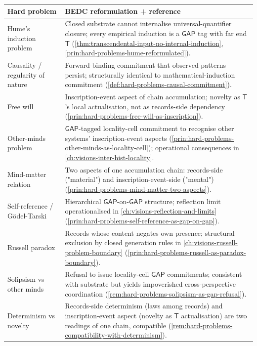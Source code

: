 \begin{longtable}{p{}p{}}
\toprule
\textbf{Hard problem} & \textbf{BEDC reformulation + reference} \\
\midrule
Hume's induction problem & Closed substrate cannot internalise universal-quantifier closure; every empirical induction is a $\mathsf{GAP}$ tag with far end $\mathsf{T}$ (\autoref{thm:transcendental-input-no-internal-induction}, \autoref{prin:hard-problems-hume-reformulated}). \\
Causality / regularity of nature & Forward-binding commitment that observed patterns persist; structurally identical to mathematical-induction commitment (\autoref{def:hard-problems-causal-commitment}). \\
Free will & Inscription-event aspect of chain accumulation; novelty as $\mathsf{T}$'s local actualisation, not as records-side dependency (\autoref{prin:hard-problems-free-will-as-inscription}). \\
Other-minds problem & $\mathsf{GAP}$-tagged locality-cell commitment to recognise other systems' inscription-event aspects (\autoref{prin:hard-problems-other-minds-as-locality-cell}); operational consequences in \autoref{ch:visions-inter-hist-locality}. \\
Mind-matter relation & Two aspects of one accumulation chain: records-side ("material") and inscription-event-side ("mental") (\autoref{prin:hard-problems-mind-matter-two-aspects}). \\
Self-reference / G\"{o}del-Tarski & Hierarchical $\mathsf{GAP}$-on-$\mathsf{GAP}$ structure; reflection limit operationalised in \autoref{ch:visions-reflection-and-limits} (\autoref{prin:hard-problems-self-reference-as-gap-on-gap}). \\
Russell paradox & Records whose content negates own presence; structural exclusion by closed generation rules in \autoref{ch:visions-russell-problem-boundary} (\autoref{prin:hard-problems-russell-as-paradox-boundary}). \\
Solipsism vs other minds & Refusal to issue locality-cell $\mathsf{GAP}$ commitments; consistent with substrate but yields impoverished cross-perspective coordination (\autoref{rem:hard-problems-solipsism-as-gap-refusal}). \\
Determinism vs novelty & Records-side determinism (laws among records) and inscription-event aspect (novelty as $\mathsf{T}$ actualisation) are two readings of one chain, compatible (\autoref{rem:hard-problems-compatibility-with-determinism}). \\

\end{longtable}
